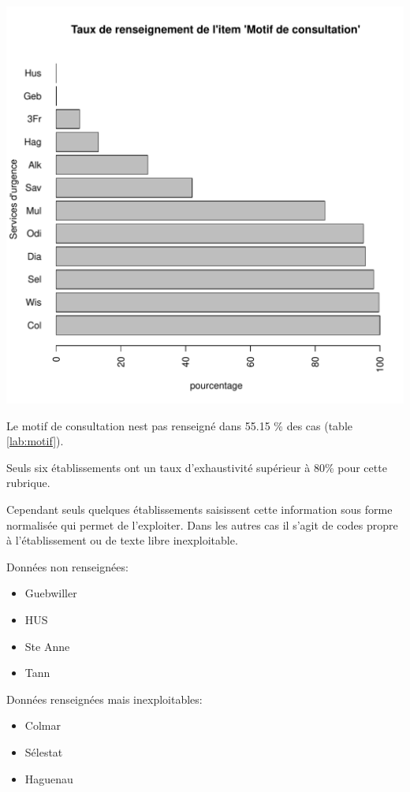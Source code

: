\documentclass[12pt,english,french,twoside]{report}\usepackage[]{graphicx}\usepackage[]{color}
\makeatletter
\def\maxwidth{ %
  \ifdim\Gin@nat@width>\linewidth
    \linewidth
  \else
    \Gin@nat@width
  \fi
}
\makeatother
\begin{document}
\includegraphics[width=\maxwidth]{figure/motifss2} 



Le motif de consultation nest pas renseigné dans 55.15 \% des cas (table \ref{lab:motif}).

Seuls six établissements ont un taux d'exhaustivité supérieur à 80\% pour cette rubrique.

Cependant seuls quelques établissements saisissent cette information sous forme normalisée qui permet de l'exploiter. Dans les autres cas il s'agit de codes propre à l'établissement ou de texte libre inexploitable.

Données non renseignées:
\begin{itemize}
  \item Guebwiller
  \item HUS
  \item Ste Anne
  \item Tann
\end{itemize}

Données renseignées mais inexploitables:
\begin{itemize}
  \item Colmar
  \item Sélestat
  \item Haguenau
\end{itemize}
\end{document}
